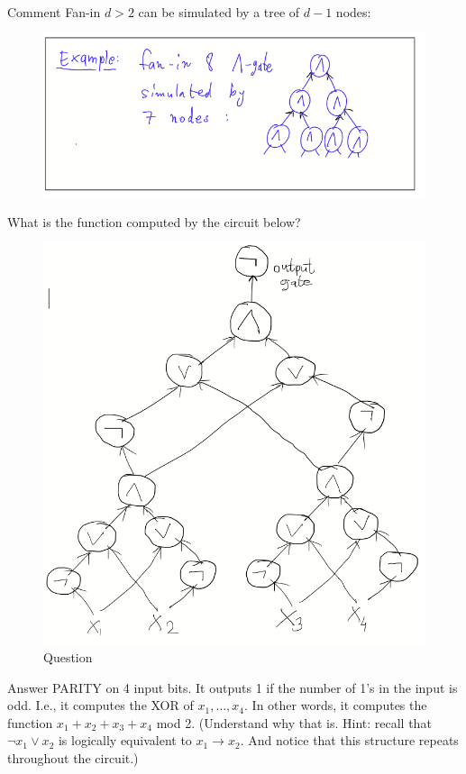 %
\begin{trailer}{Comment}
Fan-in $d>2$ 
can be simulated by a tree of $d-1 $ nodes: 
\begin{figure}[h]
    \centering
    \includegraphics[width=0.6\linewidth]{images/Example-tree-circuit.png}
    \label{fig:enter-label}
\end{figure}
\end{trailer}


\newpage 

\begin{question}{What is the function computed by the circuit below?}
\begin{figure}
    \centering
    \includegraphics[width=0.75\linewidth]{images/parity-circuit-question.png}
    \caption{Question}
    \label{fig:enter-label}
\end{figure}
\end{question}

\begin{trailer}{Answer}
     PARITY on 4 input bits. It outputs 1 if the number of 1's in the input is odd. I.e., it computes the XOR of $x_1, \ldots, x_4$. In other words, it computes the function $x_1+x_2+x_3+x_4$ mod 2. (Understand why that is. Hint: recall that ${\neg x_1}\lor x_2$ is logically equivalent to $x_1\to x_2$. And notice that this structure repeats throughout the circuit.)
\end{trailer}

